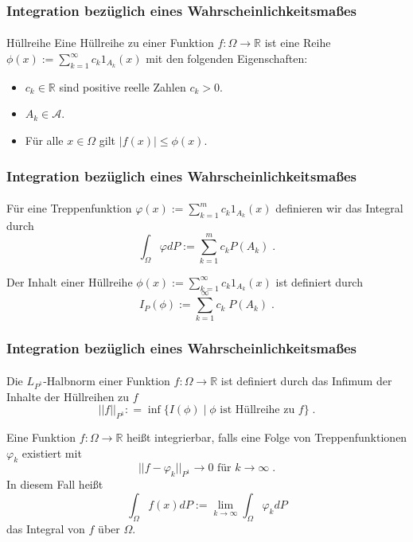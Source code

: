 \documentclass{beamer}
\begin{document}
\begin{frame}
    \frametitle{Integration bezüglich eines Wahrscheinlichkeitsmaßes}
\framesubtitle{}

\begin{block}{Hüllreihe}
Eine Hüllreihe zu einer Funktion $f :\Omega \to \mathbb{R}$ ist eine Reihe $\phi(x):= \sum_{k=1}^{\infty} c_k  1_{A_k} (x)$ mit den folgenden Eigenschaften:
\begin{itemize}
\item $c_k \in \mathbb{R}$ sind positive reelle Zahlen $c_k >0$.
\item $A_k \in \mathcal{A}$.
\item Für alle $x \in \Omega$ gilt $|f(x) | \leq \phi(x)$.
\end{itemize}
\end{block}

 \end{frame}



\begin{frame}
    \frametitle{Integration bezüglich eines Wahrscheinlichkeitsmaßes}
\framesubtitle{}

\begin{block}{}
Für eine Treppenfunktion $ \varphi(x) := \sum_{k=1}^m c_k 1_{A_k}(x)$ definieren wir das Integral durch
$$\int_{\Omega} \varphi dP := \sum_{k =1}^m  c_k P(A_k) \; . $$
\end{block}


\begin{block}{}
Der Inhalt einer Hüllreihe $\phi(x):= \sum_{k=1}^{\infty} c_k  1_{A_k} (x)$ ist definiert durch 
$$I_P (\phi) := \sum_{k=1}^{\infty} c_k \;  P(A_k) \; .$$
\end{block}

 \end{frame}




\begin{frame}
    \frametitle{Integration bezüglich eines Wahrscheinlichkeitsmaßes}
\framesubtitle{}

\begin{block}{}
Die $L_{P^1}$-Halbnorm einer Funktion $f : \Omega\to \mathbb{R}$ ist definiert durch das Infimum der Inhalte der Hüllreihen zu $f$
$$ || f ||_{P^1} : = \inf  \biggl \{   I(\phi) \; | \; \phi  \text{ ist Hüllreihe zu  }  f \biggr \} \; .$$
\end{block}

\begin{block}{}
Eine Funktion $f : \Omega \to \mathbb{R}$ heißt integrierbar, falls eine Folge von Treppenfunktionen  $\varphi_k$ existiert mit
$$ || f -  \varphi_k ||_{P^1} \to 0 \text{ für } k \to \infty \;. $$
In diesem Fall heißt
$$ \int_{\Omega} f(x) dP := \lim_{k \to \infty}  \int_{\Omega}  \varphi_k  dP$$
das Integral von $f$ über $\Omega$.
\end{block}

 \end{frame}
\end{document}

